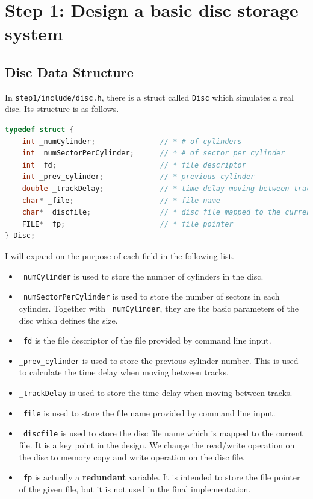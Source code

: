 \section{Step 1: Design a basic disc storage system}
\subsection{Disc Data Structure}
In \texttt{step1/include/disc.h}, there is a struct called \texttt{Disc} which 
simulates a real disc. Its structure is as follows.

\begin{lstlisting}[language=C]
typedef struct {
    int _numCylinder;               // * # of cylinders
    int _numSectorPerCylinder;      // * # of sector per cylinder
    int _fd;                        // * file descriptor
    int _prev_cylinder;             // * previous cylinder
    double _trackDelay;             // * time delay moving between tracks
    char* _file;                    // * file name
    char* _discfile;                // * disc file mapped to the current file
    FILE* _fp;                      // * file pointer
} Disc;

\end{lstlisting}

I will expand on the purpose of each field in the following list.

\begin{itemize}
    \item \texttt{_numCylinder} is used to store the number of cylinders in the disc.
    \item \texttt{_numSectorPerCylinder} is used to store the number of sectors in each cylinder. Together
    with \texttt{_numCylinder}, they are the basic parameters of the disc which defines the size.
    \item \texttt{_fd} is the file descriptor of the file provided by command line input.
    \item \texttt{_prev\_cylinder} is used to store the previous cylinder number. This is used to calculate
    the time delay when moving between tracks.
    \item \texttt{_trackDelay} is used to store the time delay when moving between tracks. 
    \item \texttt{_file} is used to store the file name provided by command line input.
    \item \texttt{_discfile} is used to store the disc file name which is mapped to the current file. It is
    a key point in the design. We change the read/write operation on the disc to memory copy and write
   operation on the disc file. 
   \item \texttt{_fp} is actually a \textbf{redundant} variable. It is intended to store the file pointer of the
    given file, but it is not used in the final implementation.
\end{itemize}

